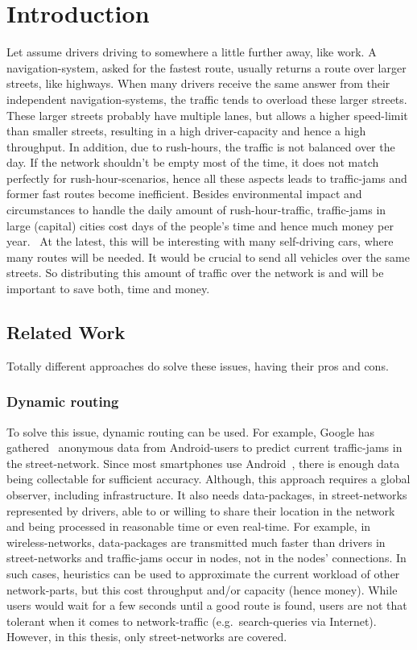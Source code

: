 \chapter{Introduction}
\label{chap:introduction}

Let assume drivers driving to somewhere a little further away, like work.
A navigation-system, asked for the fastest route, usually returns a route over larger streets, like highways.
When many drivers receive the same answer from their independent navigation-systems, the traffic tends to overload these larger streets.
These larger streets probably have multiple lanes, but allows a higher speed-limit than smaller streets, resulting in a high driver-capacity and hence a high throughput.
In addition, due to rush-hours, the traffic is not balanced over the day.
If the network shouldn't be empty most of the time, it does not match perfectly for rush-hour-scenarios, hence all these aspects leads to traffic-jams and former fast routes become inefficient.
Besides environmental impact and circumstances to handle the daily amount of rush-hour-traffic, traffic-jams in large (capital) cities cost days of the people's time and hence much money per year.~\cite{inrix:traffic-cost}
At the latest, this will be interesting with many self-driving cars, where many routes will be needed.
It would be crucial to send all vehicles over the same streets.
So distributing this amount of traffic over the network is and will be important to save both, time and money.

    \section{Related Work}

    Totally different approaches do solve these issues, having their pros and cons.

    \subsection{Dynamic routing}

    To solve this issue, dynamic routing can be used.
    For example, Google has gathered~\cite{barth:google-traffic} anonymous data from Android-users to predict current traffic-jams in the street-network.
    Since most smartphones use Android~\cite{kantar:android-vs-ios}, there is enough data being collectable for sufficient accuracy.
    Although, this approach requires a global observer, including infrastructure.
    It also needs data-packages, in street-networks represented by drivers, able to or willing to share their location in the network and being processed in reasonable time or even real-time.
    For example, in wireless-networks, data-packages are transmitted much faster than drivers in street-networks and traffic-jams occur in nodes, not in the nodes' connections.
    In such cases, heuristics can be used to approximate the current workload of other network-parts, but this cost throughput and/or capacity (hence money).
    While users would wait for a few seconds until a good route is found, users are not that tolerant when it comes to network-traffic (e.g.\ search-queries via Internet).
    However, in this thesis, only street-networks are covered.

